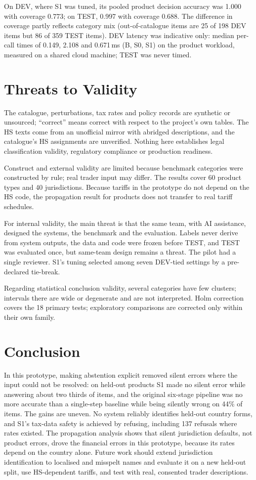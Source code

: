 \documentclass[conference]{IEEEtran}
\begin{document}


On DEV, where S1 was tuned, its pooled product decision accuracy was 1.000 with coverage
0.773; on TEST, 0.997 with coverage 0.688. The difference in coverage partly reflects category mix (out-of-catalogue
items are 25 of 198 DEV items but 86 of 359 TEST items). DEV latency was indicative only: median per-call times of 0.149,
2.108 and 0.671\,ms (B, S0, S1) on the product workload, measured on a shared cloud machine; TEST was never timed.

\section{Threats to Validity}
The catalogue, perturbations, tax rates and policy records are synthetic or unsourced;
``correct'' means correct with respect to the project's own tables. The HS texts come from an unofficial mirror with
abridged descriptions, and the catalogue's HS assignments are unverified. Nothing here establishes legal classification
validity, regulatory compliance or production readiness.

Construct and external validity are limited because benchmark categories were constructed by rule; real trader input may differ.
The results cover 60 product types and 40 jurisdictions. Because tariffs in the prototype do not depend on the HS code,
the propagation result for products does not transfer to real tariff schedules.

For internal validity, the main threat is that the same team, with AI assistance, designed the systems, the benchmark and the evaluation.
Labels never derive from system outputs, the data and code were frozen before TEST, and TEST was evaluated once, but
same-team design remains a threat. The pilot had a single reviewer. S1's tuning selected among seven DEV-tied settings
by a pre-declared tie-break.

Regarding statistical conclusion validity, several categories have few clusters; intervals there are wide or degenerate
and are not interpreted. Holm correction covers the 18 primary tests; exploratory comparisons are corrected only within
their own family.

\section{Conclusion}
In this prototype, making abstention explicit removed silent errors where the input could not be resolved: on held-out
products S1 made no silent error while answering about two thirds of items, and the original six-stage pipeline was no
more accurate than a single-step baseline while being silently wrong on 44\% of items. The gains are uneven. No system
reliably identifies held-out country forms, and S1's tax-data safety is achieved by refusing, including 137 refusals where
rates existed. The propagation analysis shows that silent jurisdiction defaults, not product errors, drove the
financial errors in this prototype, because its rates depend on the country alone. Future work should extend
jurisdiction identification to localised and misspelt names and evaluate it on a new held-out split, use HS-dependent
tariffs, and test with real, consented trader descriptions.
\end{document}
